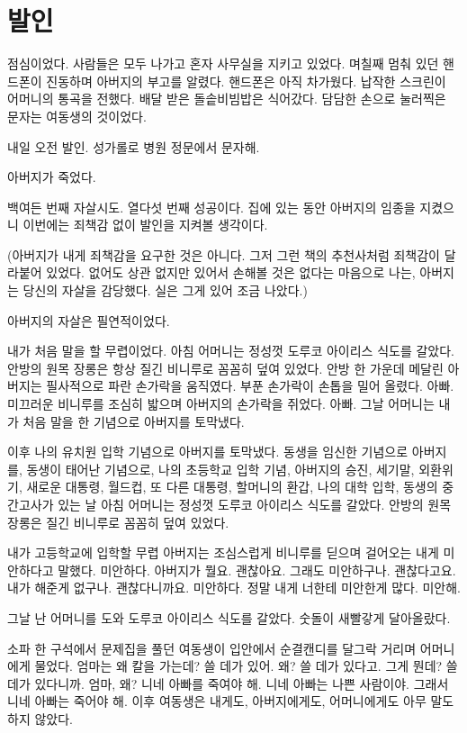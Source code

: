 \documentclass[a5paper,10pt, twoside, openright]{memoir}
\begin{document}
	

			\chapter{발인}

	점심이었다. 사람들은 모두 나가고 혼자 사무실을 지키고 있었다. 며칠째 멈춰 있던 핸드폰이 진동하며 아버지의 부고를 알렸다. 핸드폰은 아직 차가웠다. 납작한 스크린이 어머니의 통곡을 전했다. 배달 받은 돌솥비빔밥은 식어갔다. 담담한 손으로 눌러찍은 문자는 여동생의 것이었다.

	내일 오전 발인. 성가롤로 병원 정문에서 문자해.

	아버지가 죽었다.

	백여든 번째 자살시도. 열다섯 번째 성공이다. 집에 있는 동안 아버지의 임종을 지켰으니 이번에는 죄책감 없이 발인을 지켜볼 생각이다.

	(아버지가 내게 죄책감을 요구한 것은 아니다. 그저 그런 책의 추천사처럼 죄책감이 달라붙어 있었다. 없어도 상관 없지만 있어서 손해볼 것은 없다는 마음으로 나는, 아버지는 당신의 자살을 감당했다. 실은 그게 있어 조금 나았다.)

	아버지의 자살은 필연적이었다.

	내가 처음 말을 할 무렵이었다. 아침 어머니는 정성껏 도루코 아이리스 식도를 갈았다. 안방의 원목 장롱은 항상 질긴 비니루로 꼼꼼히 덮여 있었다. 안방 한 가운데 메달린 아버지는 필사적으로 파란 손가락을 움직였다. 부푼 손가락이 손톱을 밀어 올렸다. 아빠. 미끄러운 비니루를 조심히 밟으며 아버지의 손가락을 쥐었다. 아빠. 그날 어머니는 내가 처음 말을 한 기념으로 아버지를 토막냈다.

	이후 나의 유치원 입학 기념으로 아버지를 토막냈다. 동생을 임신한 기념으로 아버지를, 동생이 태어난 기념으로, 나의 초등학교 입학 기념, 아버지의 승진, 세기말, 외환위기, 새로운 대통령, 월드컵, 또 다른 대통령, 할머니의 환갑, 나의 대학 입학, 동생의 중간고사가 있는 날 아침 어머니는 정성껏 도루코 아이리스 식도를 갈았다. 안방의 원목 장롱은 질긴 비니루로 꼼꼼히 덮여 있었다.

	내가 고등학교에 입학할 무렵 아버지는 조심스럽게 비니루를 딛으며 걸어오는 내게 미안하다고 말했다. 미안하다. 아버지가 뭘요. 괜찮아요. 그래도 미안하구나. 괜찮다고요. 내가 해준게 없구나. 괜찮다니까요. 미안하다. 정말 내게 너한테 미안한게 많다. 미안해.

	그날 난 어머니를 도와 도루코 아이리스 식도를 갈았다. 숫돌이 새빨갛게 달아올랐다.

	소파 한 구석에서 문제집을 풀던 여동생이 입안에서 순결캔디를 달그락 거리며 어머니에게 물었다. 엄마는 왜 칼을 가는데? 쓸 데가 있어. 왜? 쓸 데가 있다고. 그게 뭔데? 쓸 데가 있다니까. 엄마, 왜? 니네 아빠를 죽여야 해. 니네 아빠는 나쁜 사람이야. 그래서 니네 아빠는 죽어야 해. 이후 여동생은 내게도, 아버지에게도, 어머니에게도 아무 말도 하지 않았다.
\end{document}
